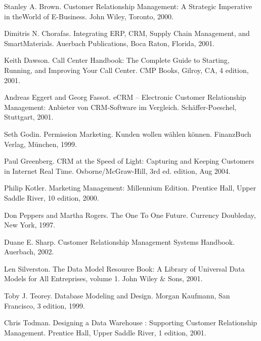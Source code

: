 \begin{course}
\begin{literature}
  

Stanley A. Brown. Customer Relationship Management: A Strategic Imperative in theWorld of E-Business. John Wiley, Toronto, 2000.

  

Dimitris N. Chorafas. Integrating ERP, CRM, Supply Chain Management, and SmartMaterials. Auerbach Publications, Boca Raton, Florida, 2001.

  

Keith Dawson. Call Center Handbook: The Complete Guide to Starting, Running, and Improving Your Call Center. CMP Books, Gilroy, CA, 4 edition, 2001.

  

Andreas Eggert and Georg Fassot. eCRM – Electronic Customer Relationship Management: Anbieter von CRM-Software im Vergleich. Schäffer-Poeschel, Stuttgart, 2001.

  

Seth Godin. Permission Marketing. Kunden wollen wählen können. FinanzBuch Verlag, München, 1999.

  

Paul Greenberg. CRM at the Speed of Light: Capturing and Keeping Customers in Internet Real Time. Osborne/McGraw-Hill, 3rd ed. edition, Aug 2004.

  

Philip Kotler. Marketing Management: Millennium Edition. Prentice Hall, Upper Saddle River, 10 edition, 2000.

  

Don Peppers and Martha Rogers. The One To One Future. Currency Doubleday, New York, 1997.

  

Duane E. Sharp. Customer Relationship Management Systems Handbook. Auerbach, 2002.

  

Len Silverston. The Data Model Resource Book: A Library of Universal Data Models for All Entreprises, volume 1. John Wiley \& Sons, 2001.

  

Toby J. Teorey. Database Modeling and Design. Morgan Kaufmann, San Francisco, 3 edition, 1999.

  

Chris Todman. Designing a Data Warehouse : Supporting Customer Relationship Management. Prentice Hall, Upper Saddle River, 1 edition, 2001.

\end{literature}



\end{course}